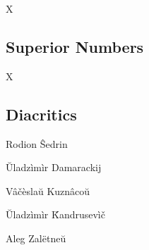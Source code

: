 \documentclass[12pt]{article}
\begin{document}
X

\subsection*{Superior Numbers}

X

\subsection*{Diacritics}

\mbox{}\par
Rodion \^{S}edrin 

\u{U}ladz\`{i}m\`{i}r Damarackij

V\^{a}\v{c}\`{e}sla\u{u} Kuzn\^{a}co\u{u}

\u{U}ladz\`{i}m\`{i}r \v{K}andrusev\`{i}\v{c}

Aleg Zal\"{e}tne\u{u}
\end{document}
